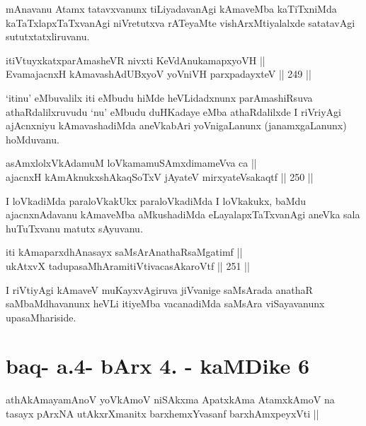 \begin{artha}
mAnavanu Atamx tatavxvanunx tiLiyadavanAgi kAmaveMba kaTiTxniMda
kaTaTxlapxTaTxvanAgi niVretutxva rATeyaMte vishArxMtiyalalxde satatavAgi
sututxtatxliruvanu.
\end{artha}

\begin{shl}
itiVtuyxkatxparAmasheVR nivxti KeVdAnukamapxyoVH || \\
EvamajacnxH kAmavashAdUBxyoV yoVniVH parxpadayxteV \hfill || 249 ||  
\end{shl}

\begin{artha}
`itinu' eMbuvalilx iti eMbudu hiMde heVLidadxnunx parAmashiRsuva
athaRdalilxruvudu `nu' eMbudu duHKadaye eMba athaRdalilxde I riVriyAgi
ajAcnxniyu kAmavashadiMda aneVkabAri yoVnigaLanunx (janamxgaLanunx)
hoMduvanu.
\end{artha}


\begin{shl}
asAmxlolxVkAdamuM loVkamamuSAmxdimameVva ca || \\
ajacnxH kAmAknukxshAkaqSoTxV jAyateV mirxyateV\s sakaqtf \hfill || 250 ||  
\end{shl}

\begin{artha}
I loVkadiMda paraloVkakUkx paraloVkadiMda I loVkakukx, baMdu
ajacnxnAdavanu kAmaveMba aMkushadiMda eLayalapxTaTxvanAgi aneVka sala
huTuTxvanu matutx sAyuvanu.
\end{artha}

\begin{shl}
iti kAmaparxdhAnasayx saMsArAnathaRsaMgatimf || \\
ukAtxvX tadupasaMhAramitiVtivacasA\s karoVtf \hfill || 251 ||  
\end{shl}

\begin{artha}
I riVtiyAgi kAmaveV muKayxvAgiruva jiVvanige saMsArada anathaR
saMbaMdhavanunx heVLi itiyeMba vacanadiMda saMsAra viSayavanunx
upasaMhariside.
\end{artha}

\section*{baq- a.4- bArx 4. - kaMDike 6}

\begin{shl}
athAkAmayamAnoV yoV\s kAmoV niSAkxma ApatxkAma AtamxkAmoV na tasayx pArxNA utAkxrXmanitx barxhemxYvasanf barxhAmxpeyxVti ||
\end{shl}

